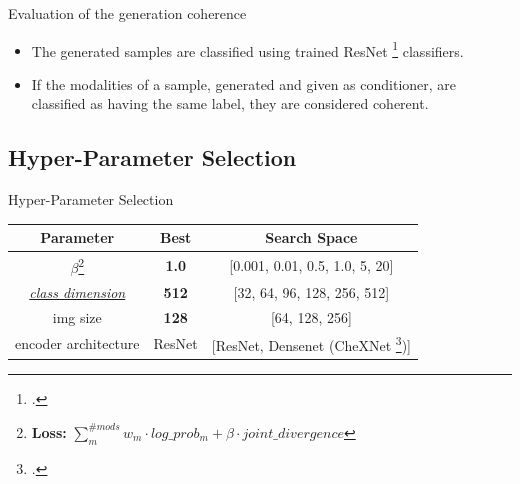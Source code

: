     \begin{frame}{Evaluation of the generation coherence}
    \begin{itemize}
        \item The generated samples are classified using trained ResNet \footcite{he2016deep} classifiers.
        \pause
        \item If the modalities of a sample, generated and given as conditioner, are classified as having the same label, they are considered coherent.
    \end{itemize}
    \end{frame}
    
    \subsection{Hyper-Parameter Selection}
    \begin{frame}{Hyper-Parameter Selection}
        \begin{center}
        \begin{table}[]

        \begin{tabular}{ c c c }
         Parameter & Best & Search Space \\ 
         \midrule
         $\beta$\footnote{\textbf{Loss:} $\sum_m^{\#mods} w_m \cdot log\_prob_m + \beta \cdot joint\_divergence $} & \textbf{1.0} & [0.001, 0.01, 0.5, 1.0, 5, 20] \\  
         \hyperlink{mopoe_graph}{\textit{class dimension}} & \textbf{512} & [32, 64, 96, 128, 256, 512]\\
         img size & \textbf{128} & [64, 128, 256]\\
         encoder architecture & ResNet & [ResNet, Densenet (CheXNet \footcite{rajpurkar2017chexnet})]
        \end{tabular}
        \end{table}
        \end{center}

    \end{frame}
    
